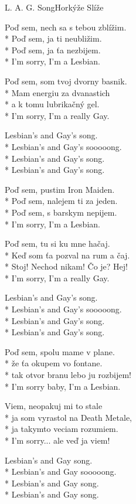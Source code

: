 \documentclass[10.5pt]{book}
\begin{document}
\begin{poem}{L. A. G. Song}{Horkýže Slíže}

\settowidth{\versewidth}{tak otvor branu lebo ju rozbijem!}

Poď sem, nech sa s tebou zblížim.\\*
Poď sem, ja ti neubližim.\\*
Poď sem, ja ťa nezbijem.\\*
I'm sorry, I'm a Lesbian.

Poď sem, som tvoj dvorny basnik.\\*
Mam energiu za dvanastich\\*
a k tomu lubrikačný gel.\\*
I'm sorry, I'm a really Gay.

Lesbian's and Gay's song.\\*
Lesbian's and Gay's sooooong.\\*
Lesbian's and Gay's song.\\*
Lesbian's and Gay's song.

Poď sem, pustim Iron Maiden.\\*
Poď sem, nalejem ti za jeden.\\*
Poď sem, s barskym nepijem.\\*
I'm sorry, I'm a Lesbian.

Poď sem, tu si ku mne hačaj.\\*
Keď som ťa pozval na rum a čaj.\\*
Stoj! Nechod nikam! Čo je? Hej!\\*
I'm sorry, I'm a really Gay.

Lesbian's and Gay's song.\\*
Lesbian's and Gay's sooooong.\\*
Lesbian's and Gay's song.\\*
Lesbian's and Gay's song.

Poď sem, spolu mame v plane.\\*
že ťa okupem vo fontane.\\*
tak otvor branu lebo ju rozbijem!\\*
I'm sorry baby, I'm a Lesbian.

Viem, neopakuj mi to stale\\*
ja som vyrastol na Death Metale,\\*
ja takymto veciam rozumiem.\\*
I'm sorry... ale veď ja viem!

Lesbian's and Gay song.\\*
Lesbian's and Gay sooooong.\\*
Lesbian's and Gay song.\\*
Lesbian's and Gay song.

\end{poem}
\end{document}
